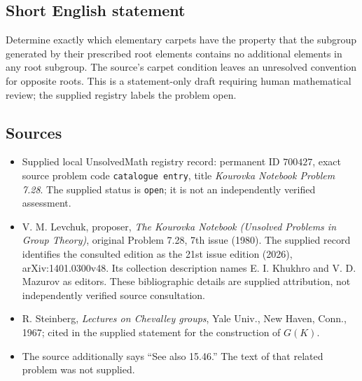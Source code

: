 \documentclass[11pt]{article}
\begin{document}
\subsection{Short English statement}
Determine exactly which elementary carpets have the property that the subgroup generated by their prescribed root elements contains no additional elements in any root subgroup. The source's carpet condition leaves an unresolved convention for opposite roots. This is a statement-only draft requiring human mathematical review; the supplied registry labels the problem open.
\subsection{Sources}
\begin{itemize}
\item Supplied local UnsolvedMath registry record: permanent ID \(700427\), exact source problem code \texttt{catalogue entry}, title \emph{Kourovka Notebook Problem 7.28}. The supplied status is \texttt{open}; it is not an independently verified assessment.
\item V. M. Levchuk, proposer, \emph{The Kourovka Notebook (Unsolved Problems in Group Theory)}, original Problem 7.28, 7th issue (1980). The supplied record identifies the consulted edition as the 21st issue edition (2026), arXiv:1401.0300v48. Its collection description names E. I. Khukhro and V. D. Mazurov as editors. These bibliographic details are supplied attribution, not independently verified source consultation.
\item R. Steinberg, \emph{Lectures on Chevalley groups}, Yale Univ., New Haven, Conn., 1967; cited in the supplied statement for the construction of \(G(K)\).
\item The source additionally says ``See also 15.46.'' The text of that related problem was not supplied.
\end{itemize}
\end{document}
